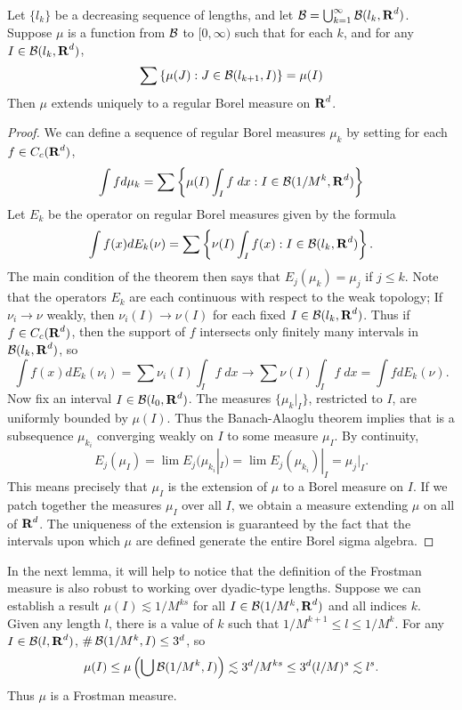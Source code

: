 \begin{lemma}
	Let $\{ l_k \}$ be a decreasing sequence of lengths, and let $\operatorname{\mathcal{B}} = \bigcup_{k = 1}^\infty \operatorname{\mathcal{B}}(l_k,\operatorname{\mathbf{R}}^d)$. Suppose $\mu$ is a function from $\operatorname{\mathcal{B}}$ to $[0,\infty)$ such that for each $k$, and for any $I \in \operatorname{\mathcal{B}}(l_k,\operatorname{\mathbf{R}}^d)$,
	\[ \sum \left\{ \mu(J) : J \in \operatorname{\mathcal{B}}(l_{k+1},I) \right\} = \mu(I) \]
	Then $\mu$ extends uniquely to a regular Borel measure on $\operatorname{\mathbf{R}}^d$.
\end{lemma}
\begin{proof}
	We can define a sequence of regular Borel measures $\mu_k$ by setting for each $f \in C_c(\operatorname{\mathbf{R}}^d)$,
	\[ \int f d\mu_k = \sum \left\{ \mu(I) \int_I f\; dx : I \in \operatorname{\mathcal{B}}(1/M^k,\operatorname{\mathbf{R}}^d) \right\} \]
	Let $E_k$ be the operator on regular Borel measures given by the formula
	\[ \int f(x) dE_k(\nu) = \sum \left\{ \nu(I) \int_I f(x) : I \in \operatorname{\mathcal{B}}(l_k,\operatorname{\mathbf{R}}^d) \right\}. \]
	The main condition of the theorem then says that $E_j(\mu_k) = \mu_j$ if $j \leq k$. Note that the operators $E_k$ are each continuous with respect to the weak topology; If $\nu_i \to \nu$ weakly, then $\nu_i(I) \to \nu(I)$ for each fixed $I \in \operatorname{\mathcal{B}}(l_k,\operatorname{\mathbf{R}}^d)$. Thus if $f \in C_c(\operatorname{\mathbf{R}}^d)$, then the support of $f$ intersects only finitely many intervals in $\operatorname{\mathcal{B}}(l_k,\operatorname{\mathbf{R}}^d)$, so
	\[ \int f(x) dE_k(\nu_i) = \sum \nu_i(I) \int_I f\; dx \to \sum \nu(I) \int_I f\; dx = \int f dE_k(\nu). \]
	Now fix an interval $I \in \operatorname{\mathcal{B}}(l_0,\operatorname{\mathbf{R}}^d)$. The measures $\{ \mu_k|_I \}$, restricted to $I$, are uniformly bounded by $\mu(I)$. Thus the Banach-Alaoglu theorem implies that is a subsequence $\mu_{k_i}$ converging weakly on $I$ to some measure $\mu_I$. By continuity,
	\[ E_j(\mu_I) = \lim E_j(\mu_{k_i}|_I) = \lim E_j(\mu_{k_i})|_I = \mu_j|_I. \]
	This means precisely that $\mu_I$ is the extension of $\mu$ to a Borel measure on $I$. If we patch together the measures $\mu_I$ over all $I$, we obtain a measure extending $\mu$ on all of $\operatorname{\mathbf{R}}^d$. The uniqueness of the extension is guaranteed by the fact that the intervals upon which $\mu$ are defined generate the entire Borel sigma algebra.
\end{proof}

In the next lemma, it will help to notice that the definition of the Frostman measure is also robust to working over dyadic-type lengths. Suppose we can establish a result $\mu(I) \lesssim 1/M^{ks}$ for all $I \in \operatorname{\mathcal{B}}(1/M^k,\operatorname{\mathbf{R}}^d)$ and all indices $k$. Given any length $l$, there is a value of $k$ such that $1/M^{k+1} \leq l \leq 1/M^k$. For any $I \in \operatorname{\mathcal{B}}(l,\operatorname{\mathbf{R}}^d)$, $\# \operatorname{\mathcal{B}}(1/M^k,I) \leq 3^d$, so
%
\[ \mu(I) \leq \mu \left(\bigcup \operatorname{\mathcal{B}}(1/M^k,I) \right) \lesssim 3^d/M^{ks} \leq 3^d(l/M)^s \lesssim l^s. \]
%
Thus $\mu$ is a Frostman measure.

